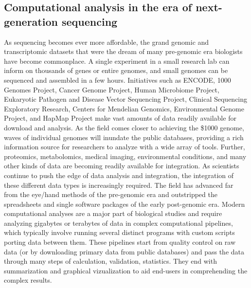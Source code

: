 \documentclass[ChapterTOCs,krantz2]{krantz} %
\begin{document}
\subsection{Computational analysis in the era of next-generation sequencing}

As sequencing becomes ever more affordable,
the grand genomic and transcriptomic datasets that were the
dream of many pre-genomic era biologists have become commonplace.  A single
experiment in a small research lab can inform on
thousands of genes or entire genomes, and small genomes can be sequenced and assembled in a few hours.
Initiatives such as ENCODE\cite{Encode2004,Myers2011}, 
1000 Genomes Project\cite{Altshuler2010}, 
Cancer Genome Project\cite{Cosmic2011}, Human Microbiome Project\cite{Lewis2012}, 
Eukaryotic Pathogen and Disease Vector Sequencing Project\cite{EPDVSP}, 
Clinical Sequencing Exploratory Research\cite{CSER}, 
Centers for Mendelian Genomics\cite{CMG}, Environmental Genome Project\cite{EGP}, 
and HapMap Project\cite{IHP} make vast amounts of data readily available for
download and analysis.
As the field comes closer to achieving the 
\$1000 genome\cite{Mardis2006}, waves of individual genomes will inundate the 
public databases, providing a rich information source for
researchers to analyze with a wide array of tools.  Further,
proteomics, metabolomics, medical imaging, environmental conditions, and many
other kinds of data are becoming readily available for integration.  As
scientists continue to push the edge of data analysis and integration, the integration of these
different data types is increasingly required.  The field has
advanced far from the eye/hand methods of the pre-genomic era and outstripped
the spreadsheets and single software packages of the early post-genomic era.  
Modern computational analyses are a major part of biological studies \cite{Zhulin2009}
and require analyzing gigabytes or terabytes of data in complex computational
pipelines, which typically involve running several distinct programs with custom
scripts porting data between them.  These pipelines start from quality control on raw data (or by downloading primary data from public databases) and pass the data through many steps of calculation, validation, statistics.  They end with
summarization and graphical vizualization to aid end-users in comprehending the
complex results.
\end{document}

